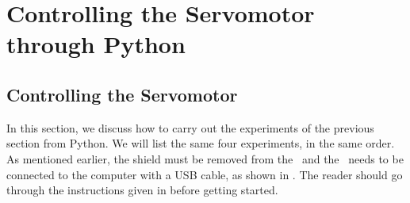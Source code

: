 \section{Controlling the Servomotor through Python}
\subsection{Controlling the Servomotor}
\label{sec:servo-py}
In this section, we discuss how to carry out the experiments of the
previous section from Python.  We will list the same four experiments,
in the same order. As mentioned earlier, the shield must be removed from 
the \arduino\ and the \arduino\ needs to be connected to the computer 
with a USB cable, as shown in . The reader should go through the instructions given in
 before getting started.


